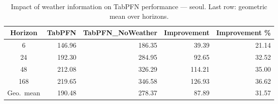 \begin{table}
\centering
\caption{Impact of weather information on TabPFN performance — seoul. Last row: geometric mean over horizons.}
\label{tab:tabpfn_weather_seoul}
\begin{tabular}{crrrr}
\toprule
Horizon & TabPFN & TabPFN\_NoWeather & Improvement & Improvement \% \\
\midrule
6 & 146.96 & 186.35 & 39.39 & 21.14 \\
24 & 192.30 & 284.95 & 92.65 & 32.52 \\
48 & 212.08 & 326.29 & 114.21 & 35.00 \\
168 & 219.65 & 346.58 & 126.93 & 36.62 \\
\midrule
Geo.\ mean & 190.48 & 278.37 & 87.89 & 31.57 \\
\bottomrule
\end{tabular}
\end{table}
